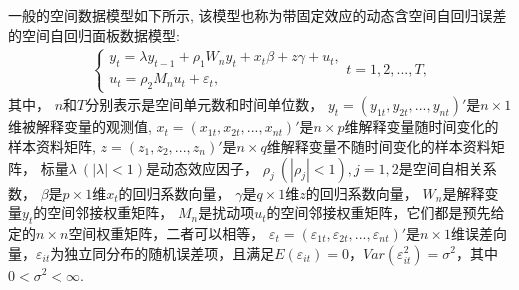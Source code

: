 \documentclass[cs4size]{article}
\def\bea{\begin{eqnarray}}
\def\eea{\end{eqnarray}}
\begin{document}
一般的空间数据模型如下所示, 该模型也称为{\kaishu 带固定效应的动态含空间自回归误差的空间自回归面板数据模型}:
\bea
\begin{cases}
y_t=\lambda y_{t-1}+ \rho_1 W_n y_t+x_{t}\beta +z\gamma+u_t,\\
u_t = \rho_2 M_n u_t + \varepsilon_t,
\end{cases} t=1,2,...,T, \label{SARAR panel model 1}
\eea
其中，
$n$和$T$分别表示是空间单元数和时间单位数，
$y_t = (y_{1t}, y_{2t},..., y_{nt})'$是$n \times1$维被解释变量的观测值, 
$x_t = (x_{1t},x_{2t}, ... , x_{nt})'$是$n \times p$维解释变量随时间变化的样本资料矩阵, 
$z = (z_{1},z_{2}, ... , z_{n})'$是$n \times q$维解释变量不随时间变化的样本资料矩阵，
标量$\lambda ~ (|\lambda|<1)$是动态效应因子，
$\rho_j~ (|\rho_j|<1), j=1,2$是空间自相关系数，
$\beta$是$p\times1$维$x_t$的回归系数向量，
$\gamma$是$q\times1$维$z$的回归系数向量，
$W_n$是解释变量$y_t$的空间邻接权重矩阵，
$M_n$是扰动项$u_t$的空间邻接权重矩阵，它们都是预先给定的$n \times n$空间权重矩阵，二者可以相等，
$\varepsilon_t=(\varepsilon_{1t},\varepsilon_{2t}, ... , \varepsilon_{nt})'$是$n \times1$维误差向量，$\varepsilon_{it}$为独立同分布的随机误差项，且满足$E(\varepsilon_{it})=0$，$Var(\varepsilon_{it}^2)=\sigma^2$，其中$0<\sigma^2<\infty$. 
\end{document}
